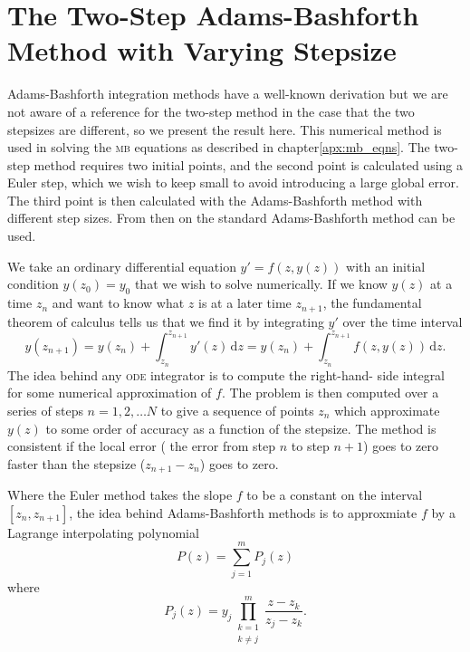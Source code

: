 \chapter[The Two-Step Adams-Bashforth Method]
  {The Two-Step Adams-Bashforth\\ Method with Varying Stepsize}
  \label{apx:ab_method}

    Adams-Bashforth integration methods have a well-known derivation but we are
    not aware of a reference for the two-step method in the case that the two
    stepsizes are different, so we present the result here. This numerical
    method is used in solving the \textsc{mb} equations as described in
    chapter\ref{apx:mb_eqns}. The two-step method requires two initial points,
    and  the second point is calculated using a Euler step, which we wish to
    keep small to avoid introducing a large global error. The third point is
    then calculated with the Adams-Bashforth method with different step sizes.
    From then on the standard Adams-Bashforth method can be used.

    We take an ordinary differential equation $y' = f(z,y(z))$ with an initial
    condition $y(z_0) = y_0$ that we wish to solve numerically. If we know
    $y(z)$ at a time $z_n$ and want to know what $z$ is at a later time
    $z_{n+1}$, the fundamental theorem of calculus tells us that we find it by
    integrating $y'$ over the time interval
    \begin{equation}\label{eqn:fund_thrm_calculus}
      y(z_{n+1}) = y(z_n) + \int_{z_n}^{z_{n+1}} \! y'(z) \, 
      \mathrm{d}z = y(z_n) + \int_{z_n}^{z_{n+1}} \! f(z,y(z)) \, \mathrm{d}z.
    \end{equation}
    The idea behind any \textsc{ode} integrator is to compute the right-hand-
    side integral for some numerical approximation of $f$. The problem is then
    computed over a series of steps $n = 1, 2, \dots N$ to give a sequence of
    points $z_n$ which approximate $y(z)$ to some order of accuracy as a
    function of the stepsize. The method is consistent if the local error (\ie
    the error from step $n$ to step $n+1$) goes to zero faster than the stepsize
    ($z_{n+1} - z_n$) goes to zero.

    Where the Euler method takes the slope $f$ to be a constant on the interval
    $[z_n, z_{n+1}]$, the idea behind Adams-Bashforth methods is to approxmiate
    $f$ by a Lagrange interpolating polynomial\cite{arfken2005mathematical}
    \begin{equation}
      P(z) = \sum_{j=1}^{m}{P_j(z)} 
    \end{equation}
    where
    \begin{equation}
      P_j(z) = y_j \prod_{\substack{k=1 \\ k \ne j}}^{m}{ 
      \frac{z - z_k}{z_j - z_k} }.
    \end{equation}

